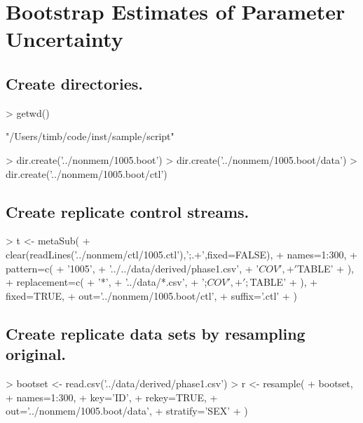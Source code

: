 \section{Bootstrap Estimates of Parameter Uncertainty}
\subsection{Create directories.}
\begin{Schunk}
\begin{Sinput}
> getwd()
\end{Sinput}
\begin{Soutput}
[1] "/Users/timb/code/inst/sample/script"
\end{Soutput}
\begin{Sinput}
> dir.create('../nonmem/1005.boot')
> dir.create('../nonmem/1005.boot/data')
> dir.create('../nonmem/1005.boot/ctl')
\end{Sinput}
\end{Schunk}
\subsection{Create replicate control streams.}
\begin{Schunk}
\begin{Sinput}
> t <- metaSub(
+      clear(readLines('../nonmem/ctl/1005.ctl'),';.+',fixed=FALSE),
+      names=1:300,
+      pattern=c(
+          '1005',
+          '../../data/derived/phase1.csv',
+          '$COV',
+          '$TABLE'
+      ),
+      replacement=c(
+          '*',
+          '../data/*.csv',
+          ';$COV',
+          ';$TABLE'
+     ),
+     fixed=TRUE,
+     out='../nonmem/1005.boot/ctl',
+     suffix='.ctl'
+  )
\end{Sinput}
\end{Schunk}
\subsection{Create replicate data sets by resampling original.}
\begin{Schunk}
\begin{Sinput}
>  bootset <- read.csv('../data/derived/phase1.csv')
>  r <- resample(
+  	bootset,
+  	names=1:300,
+  	key='ID',
+  	rekey=TRUE,
+  	out='../nonmem/1005.boot/data',
+  	stratify='SEX'
+  )
\end{Sinput}
\end{Schunk}
